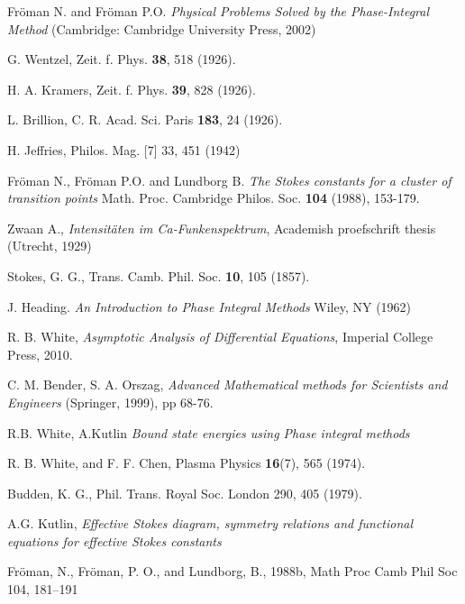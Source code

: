 \documentclass[aip,jmp,reprint]{revtex4-1}
\begin{document}
\begin{thebibliography}{30}

 Fr\"oman N. and Fr\"oman P.O. \textit{Physical Problems Solved by the Phase-Integral Method} (Cambridge: Cambridge University Press, 2002)

 G. Wentzel, Zeit. f. Phys. \textbf{38}, 518 (1926).

 H. A. Kramers, Zeit. f. Phys. \textbf{39}, 828 (1926).

 L. Brillion, C. R. Acad. Sci. Paris \textbf{183}, 24 (1926).

 H. Jeffries, Philos. Mag. [7] 33, 451 (1942)

 Fr\"oman N., Fr\"oman P.O. and Lundborg B. \textit{The Stokes constants for a cluster of transition
points} Math. Proc. Cambridge Philos. Soc. \textbf{104} (1988), 153-179.

 Zwaan A., \textit{Intensit\"aten im Ca-Funkenspektrum}, Academish proefschrift thesis (Utrecht, 1929)

 Stokes, G. G., Trans. Camb. Phil. Soc. \textbf{10}, 105 (1857).

 J. Heading. {\it An Introduction to Phase Integral Methods} 
Wiley, NY (1962)

 R. B. White, {\it Asymptotic Analysis of Differential Equations}, Imperial College Press, 2010.

 C. M. Bender, S. A. Orszag, \textit{Advanced Mathematical methods for
Scientists and Engineers} (Springer, 1999), pp 68-76.

 R.B. White, A.Kutlin {\it Bound state energies using Phase integral methods} 

 R. B. White, and F. F. Chen, {Plasma Physics} \textbf{16}(7), 565 (1974).

 Budden, K. G., Phil. Trans. Royal Soc. London 290, 405 (1979).

  A.G. Kutlin, \textit{Effective Stokes diagram, symmetry relations and functional equations for effective Stokes constants}

 Fr\"oman, N., Fr\"oman, P. O., and Lundborg, B., 1988b, Math Proc Camb Phil Soc 104, 181–191

\end{thebibliography}
\end{document}
